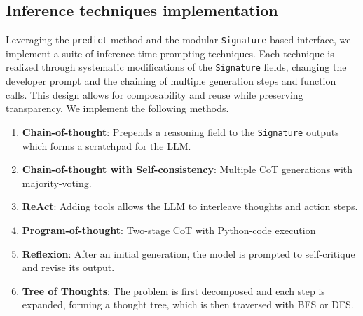 \subsection{Inference techniques implementation}
Leveraging the \texttt{predict} method and the modular \texttt{Signature}-based interface, we implement a suite of inference-time prompting techniques. 
Each technique is realized through systematic modifications of the \texttt{Signature} fields, changing the developer prompt and the chaining of multiple generation steps 
and function calls. This design allows for composability and reuse while preserving transparency.
We implement the following methods.
\begin{enumerate}
    \item \textbf{Chain-of-thought}\cite{NEURIPS2022_8bb0d291}: Prepends a reasoning field to the \texttt{Signature} outputs which forms a scratchpad for the LLM.
    \item \textbf{Chain-of-thought with Self-consistency}\cite{wang2023selfconsistencyimproveschainthought}: Multiple CoT generations with majority-voting.
    \item \textbf{ReAct}\cite{yao2023reactsynergizingreasoningacting}: Adding tools allows the LLM to interleave thoughts and action steps.
    \item \textbf{Program-of-thought}\cite{chen2023programthoughtspromptingdisentangling}: Two-stage CoT with Python-code execution
    \item \textbf{Reflexion}\cite{shinn2023reflexionlanguageagentsverbal}: After an initial generation, the model is prompted to self-critique and revise its output.
    \item \textbf{Tree of Thoughts}\cite{yao2023treethoughtsdeliberateproblem}: The problem is first decomposed and each step is expanded, forming a thought tree, which is then traversed with BFS or DFS.
\end{enumerate}

